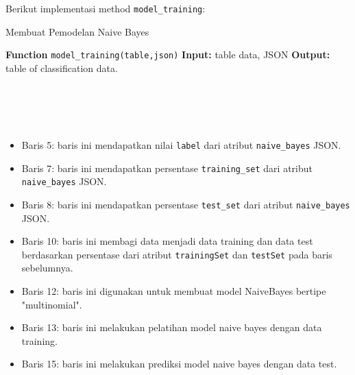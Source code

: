 \noindent Berikut implementasi method \texttt{model\_training}:

\begin{minipage}{.8\linewidth}
\begin{algorithm}[H]
  \caption{Membuat Pemodelan Naive Bayes}\label{alg:6}
  \begin{algorithmic}[1]
  \State \textbf{Function} \texttt{model\_training(table,json)}
  \State \textbf{Input:} table data, JSON
  \State \textbf{Output:} table of classification data.
  \\
  \\
  \\
  \\
  \\
  \end{algorithmic}
\end{algorithm}
\end{minipage}

\vspace{0.2cm}
\begin{itemize}
\item Baris 5: baris ini mendapatkan nilai \texttt{label} dari atribut \texttt{naive\_bayes} JSON.
\item Baris 7: baris ini mendapatkan persentase \texttt{training\_set} dari atribut \texttt{naive\_bayes} JSON. 
\item Baris 8: baris ini mendapatkan persentase \texttt{test\_set} dari atribut \texttt{naive\_bayes} JSON. 
\item Baris 10: baris ini membagi data menjadi data training dan data test berdasarkan persentase dari atribut \texttt{trainingSet} dan \texttt{testSet} pada baris sebelumnya.
\item Baris 12: baris ini digunakan untuk membuat model NaiveBayes bertipe "multinomial".
\item Baris 13: baris ini melakukan pelatihan model naive bayes dengan data training.
\item Baris 15: baris ini melakukan prediksi model naive bayes dengan data test.
\end{itemize}

